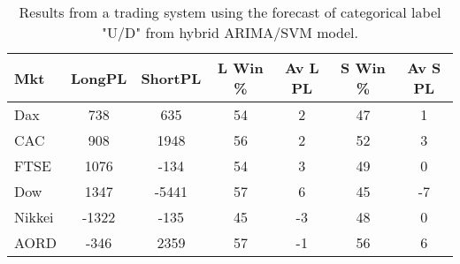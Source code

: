 \begin{table}[ht]
\centering
\caption[Results from a trading system using the forecast of categorical label "U/D" from hybrid ARIMA/SVM model]{Results from a trading system using the forecast of categorical label "U/D" from hybrid ARIMA/SVM model.} 
\label{tab:chp_ts:pUD_CAT_arima_svm_sys}
\begin{tabular}{lcccccc}
  \toprule Mkt & LongPL & ShortPL & L Win \% & Av L PL & S Win \% & Av S PL \\ 
  \midrule Dax & 738 & 635 & 54 & 2 & 47 & 1 \\ 
  CAC & 908 & 1948 & 56 & 2 & 52 & 3 \\ 
  FTSE & 1076 & -134 & 54 & 3 & 49 & 0 \\ 
  Dow & 1347 & -5441 & 57 & 6 & 45 & -7 \\ 
  Nikkei & -1322 & -135 & 45 & -3 & 48 & 0 \\ 
  AORD & -346 & 2359 & 57 & -1 & 56 & 6 \\ 
   \bottomrule \end{tabular}
\end{table}
